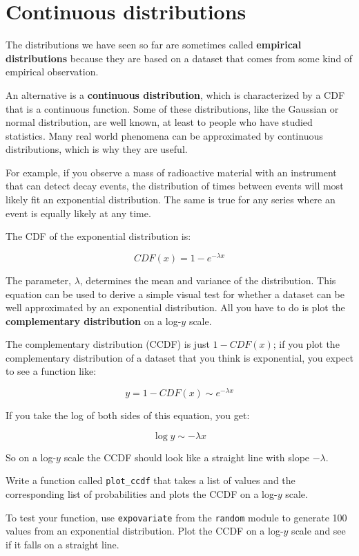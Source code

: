 \documentclass[10pt]{book}
\begin{document}
\section{Continuous distributions}

The distributions we have seen so far are sometimes called
{\bf empirical distributions} because they are based on a
dataset that comes from some kind of empirical observation.

An alternative is a {\bf continuous distribution},
which is characterized by a CDF that is a continuous function.
Some of these distributions, like the
Gaussian or normal
distribution, are well known, at least to people who have studied
statistics.  Many real world phenomena can be approximated by
continuous distributions, which is why they are useful.

For example, if you observe a mass of radioactive material with
an instrument that can detect decay events, the distribution
of times between events will most likely fit an exponential
distribution.  The same is true for any series where
an event is equally likely at any time.

The CDF of the exponential distribution is:

\[ CDF(x) = 1 - e^{-\lambda x} \]

The parameter, $\lambda$, determines the mean and variance
of the distribution.  This equation can be used to derive
a simple visual test for whether a dataset can be well
approximated by an exponential distribution.  All you
have to do is plot the {\bf complementary distribution}
on a log-$y$ scale.

The complementary distribution (CCDF) is just $1 - CDF(x)$;
if you plot the complementary distribution of a dataset
that you think is exponential, you expect to see a function
like:

\[ y = 1 - CDF(x) \sim e^{-\lambda x} \]

If you take the log of both sides of this equation, you get:

\[ \log y \sim -\lambda x \]

So on a log-$y$ scale the CCDF should look like a straight line
with slope $-\lambda$.

\begin{exercise}

Write a function called \verb"plot_ccdf" that takes
a list of values and the corresponding list of probabilities
and plots the CCDF on a log-$y$ scale.

To test your function, use {\tt expovariate} from the {\tt random}
module to generate 100 values from an exponential distribution.  Plot
the CCDF on a log-$y$ scale and see if it falls on a straight line.

\end{exercise}
\end{document}
